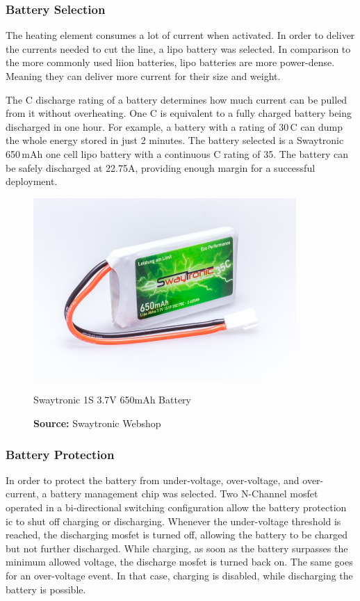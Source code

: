 \subsubsection{Battery Selection}
The heating element consumes a lot of current when activated. In order to deliver the currents needed to cut the line, a \acrfull{lipo} battery was selected. In comparison to the more commonly used \acrshort{liion} batteries, \acrshort{lipo} batteries are more power-dense. Meaning they can deliver more current for their size and weight.

The C discharge rating of a battery determines how much current can be pulled from it without overheating. One C is equivalent to a fully charged battery being discharged in one hour. For example, a battery with a rating of 30\,C can dump the whole energy stored in just 2 minutes. The battery selected is a Swaytronic 650\,mAh one cell \acrshort{lipo} battery with a continuous C rating of 35. The battery can be safely discharged at 22.75A, providing enough margin for a successful deployment. 

\begin{figure}[h!]
	\centering
	\includegraphics[width=10cm]{images/swaytronic.jpg}
	\caption{Swaytronic 1S 3.7V 650mAh Battery}
	\vspace{-1.4ex}
	\caption*{\textbf{Source:} Swaytronic Webshop \cite{swaytronic}}
	\label{fig:swaytronic}
\end{figure}

\subsubsection{Battery Protection}
In order to protect the battery from under-voltage, over-voltage, and over-current, a battery management chip was selected. Two N-Channel \acrshort{mosfet} operated in a bi-directional switching configuration allow the battery protection \acrshort{ic} to shut off charging or discharging. Whenever the under-voltage threshold is reached, the discharging \acrshort{mosfet} is turned off, allowing the battery to be charged but not further discharged. While charging, as soon as the battery surpasses the minimum allowed voltage, the discharge \acrshort{mosfet} is turned back on. The same goes for an over-voltage event. In that case, charging is disabled, while discharging the battery is possible. 

